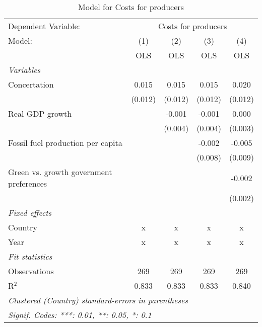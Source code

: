 
\begin{table}[htbp]
   \caption{Model for Costs for producers}
   \centering
   \begin{tabular}{lcccc}
      \toprule
      Dependent Variable: & \multicolumn{4}{c}{Costs for producers}\\
      Model:                                  & (1)     & (2)     & (3)     & (4)\\  
                                              &  OLS    & OLS     & OLS     & OLS\\  
      \midrule
      \emph{Variables}\\
      Concertation                            & 0.015   & 0.015   & 0.015   & 0.020\\   
                                              & (0.012) & (0.012) & (0.012) & (0.012)\\   
      Real GDP growth                         &         & -0.001  & -0.001  & 0.000\\   
                                              &         & (0.004) & (0.004) & (0.003)\\   
      Fossil fuel production per capita       &         &         & -0.002  & -0.005\\   
                                              &         &         & (0.008) & (0.009)\\   
      Green vs. growth government preferences &         &         &         & -0.002\\   
                                              &         &         &         & (0.002)\\   
      \emph{Fixed effects}\\
      Country                                 & x       & x       & x       & x\\  
      Year                                    & x       & x       & x       & x\\  
      \midrule \emph{Fit statistics}\\
      Observations                            & 269     & 269     & 269     & 269\\  
      R$^2$                                   & 0.833   & 0.833   & 0.833   & 0.840\\  
      \midrule
      \multicolumn{5}{l}{\emph{Clustered (Country) standard-errors in parentheses}}\\
      \multicolumn{5}{l}{\emph{Signif. Codes: ***: 0.01, **: 0.05, *: 0.1}}\\
   \end{tabular}
\end{table}


